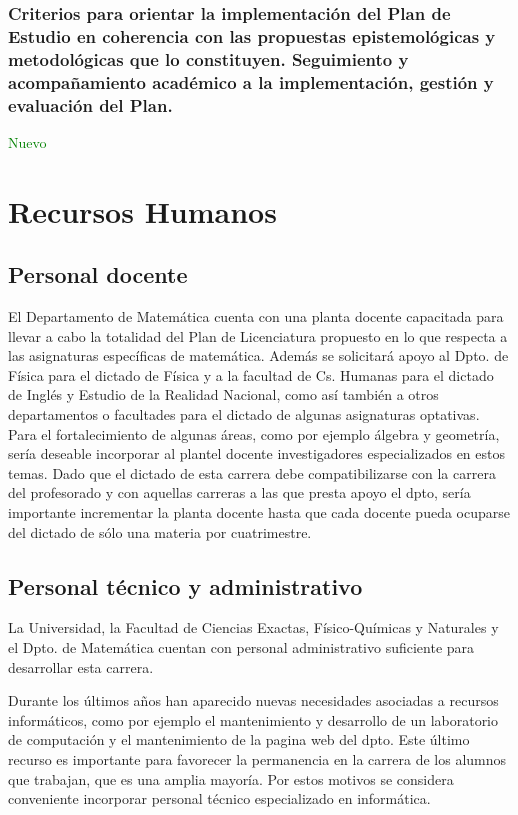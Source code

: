 \documentclass[a4paper, 12pt]{article}
\begin{document}
\subsubsection{Criterios para orientar la implementación del Plan de Estudio en coherencia con las propuestas epistemológicas y metodológicas que lo constituyen. Seguimiento y acompañamiento académico a la implementación, gestión y evaluación del Plan.
} \textcolor{green}{Nuevo}


\section{Recursos Humanos}


\subsection{Personal docente}
El Departamento de Matemática cuenta con una planta docente
capacitada para llevar a cabo la totalidad del Plan de
Licenciatura propuesto en lo que \linebreak respecta a las
asignaturas específicas de matemática. Además se solicitará apoyo
al Dpto. de Física para el dictado de Física y a la facultad de
Cs. Humanas para el dictado de Inglés y Estudio de la Realidad Nacional,
como así también a otros departamentos o facultades para el
dictado de algunas asignaturas optativas. Para el fortalecimiento
de algunas áreas, como por ejemplo álgebra y geometría, sería
deseable incorporar al plantel  docente investigadores
especializados en estos temas. Dado que el  dictado de esta
carrera debe compatibilizarse con la carrera del profesorado y con
aquellas carreras a las  que presta apoyo el dpto, sería
importante incrementar la planta docente hasta que cada docente
pueda ocuparse del dictado de sólo una materia por cuatrimestre.

\subsection{Personal técnico y administrativo}
La Universidad, la Facultad de Ciencias Exactas, Físico-Químicas y
Naturales y el Dpto. de Matemática cuentan con personal
administrativo suficiente para desarrollar esta carrera.

Durante los últimos años han aparecido nuevas necesidades
asociadas a recursos informáticos, como por ejemplo el
mantenimiento y desarrollo de un laboratorio de computación y el
mantenimiento  de la pagina web del dpto. Este último recurso es
importante para favorecer la permanencia en la carrera de los
alumnos que trabajan, que es una amplia mayoría. Por estos
motivos se considera conveniente incorporar personal técnico
especializado en informática.
\end{document}
